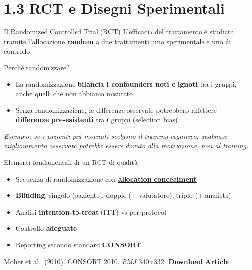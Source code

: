 \documentclass[
  ignorenonframetext,
]{beamer}
\providecommand{\tightlist}{%
  \setlength{\itemsep}{0pt}\setlength{\parskip}{0pt}}
\begin{document}
\section{1.3 RCT e Disegni
Sperimentali}\label{rct-e-disegni-sperimentali}

\begin{frame}{Il Randomized Controlled Trial (RCT)}
\label{il-randomized-controlled-trial-rct}
L'efficacia del trattamento è studiata tramite l'allocazione
\textbf{random} a due trattamenti: uno sperimentale e uno di controllo.
\end{frame}

\begin{frame}{Perché randomizzare?}
\label{perchuxe9-randomizzare}
\begin{itemize}
\tightlist
\item
  La randomizzazione \textbf{bilancia i confounders noti e ignoti} tra i
  gruppi, anche quelli che non abbiamo misurato
\item
  Senza randomizzazione, le differenze osservate potrebbero riflettere
  \textbf{differenze pre-esistenti} tra i gruppi (selection bias)
\end{itemize}

\vspace{0.5em}

\emph{Esempio: se i pazienti più motivati \emph{scelgono} il training
cognitivo, qualsiasi miglioramento osservato potrebbe essere dovuto alla
motivazione, non al training.}

\vspace{0.5em}
\end{frame}

\begin{frame}{Elementi fondamentali di un RCT di qualità}
\label{elementi-fondamentali-di-un-rct-di-qualituxe0}
\small

\begin{itemize}
\tightlist
\item
  Sequenza di randomizzazione con
  \href{https://pmc.ncbi.nlm.nih.gov/articles/PMC6022887/pdf/10.1177_0141076818776604.pdf}{\underline{\textbf{allocation concealment}}}
\item
  \textbf{Blinding}: singolo (paziente), doppio (+ valutatore), triplo
  (+ analista)
\item
  Analisi \textbf{intention-to-treat} (ITT) vs per-protocol
\item
  Controllo \textbf{adeguato}
\item
  Reporting secondo standard \textbf{CONSORT}
\end{itemize}

\vspace{0.2em}

\tiny Moher et al.~(2010). CONSORT 2010. \emph{BMJ} 340:c332.
\href{https://www.bmj.com/content/340/bmj.c332}{\underline{\textbf{Download Article}}}
\end{frame}
\end{document}
